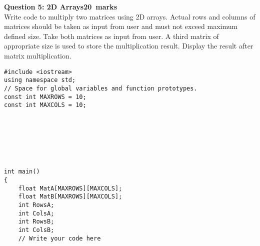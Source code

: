 \documentclass[12pt,a4paper]{article}
\def\Qfive{20}
\begin{document}
\newpage
\noindent\textbf{Question 5: 2D Arrays\hfill \Qfive~marks}\\
Write code to multiply two matrices using 2D arrays. Actual rows and columns of matrices should be taken as input from user and must not exceed maximum defined size. Take both matrices as input from user. A third matrix of appropriate size is used to store the multiplication result. Display the result after matrix multiplication.
\begin{lstlisting}
#include <iostream>
using namespace std;
// Space for global variables and function prototypes.
const int MAXROWS = 10;
const int MAXCOLS = 10;







int main()
{
	float MatA[MAXROWS][MAXCOLS];
	float MatB[MAXROWS][MAXCOLS];
	int RowsA;
	int ColsA;
	int RowsB;
	int ColsB;
	// Write your code here
\end{lstlisting}
\newpage~
\newpage
\end{document}
